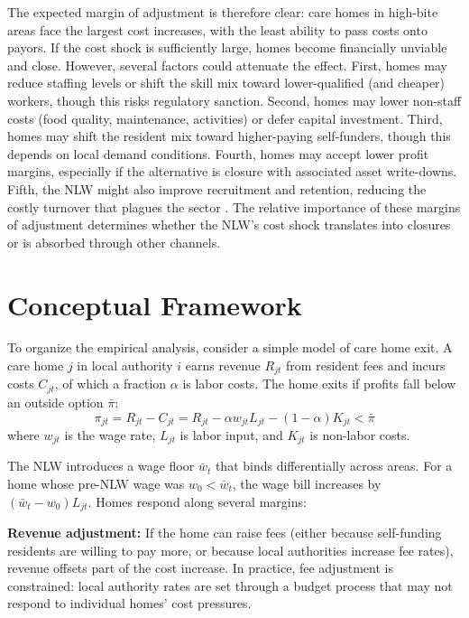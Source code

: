 \documentclass[12pt]{article}
\begin{document}
The expected margin of adjustment is therefore clear: care homes in high-bite areas face the largest cost increases, with the least ability to pass costs onto payors. If the cost shock is sufficiently large, homes become financially unviable and close. However, several factors could attenuate the effect. First, homes may reduce staffing levels or shift the skill mix toward lower-qualified (and cheaper) workers, though this risks regulatory sanction. Second, homes may lower non-staff costs (food quality, maintenance, activities) or defer capital investment. Third, homes may shift the resident mix toward higher-paying self-funders, though this depends on local demand conditions. Fourth, homes may accept lower profit margins, especially if the alternative is closure with associated asset write-downs. Fifth, the NLW might also improve recruitment and retention, reducing the costly turnover that plagues the sector \citep{skills2019state}. The relative importance of these margins of adjustment determines whether the NLW's cost shock translates into closures or is absorbed through other channels.


\section{Conceptual Framework}
\label{sec:framework}

To organize the empirical analysis, consider a simple model of care home exit. A care home $j$ in local authority $i$ earns revenue $R_{jt}$ from resident fees and incurs costs $C_{jt}$, of which a fraction $\alpha$ is labor costs. The home exits if profits fall below an outside option $\bar{\pi}$:
\begin{equation}
    \pi_{jt} = R_{jt} - C_{jt} = R_{jt} - \alpha w_{jt} L_{jt} - (1-\alpha) K_{jt} < \bar{\pi}
\end{equation}
where $w_{jt}$ is the wage rate, $L_{jt}$ is labor input, and $K_{jt}$ is non-labor costs.

The NLW introduces a wage floor $\bar{w}_t$ that binds differentially across areas. For a home whose pre-NLW wage was $w_0 < \bar{w}_t$, the wage bill increases by $(\bar{w}_t - w_0) L_{jt}$. Homes respond along several margins:

\textbf{Revenue adjustment:} If the home can raise fees (either because self-funding residents are willing to pay more, or because local authorities increase fee rates), revenue offsets part of the cost increase. In practice, fee adjustment is constrained: local authority rates are set through a budget process that may not respond to individual homes' cost pressures.
\end{document}

